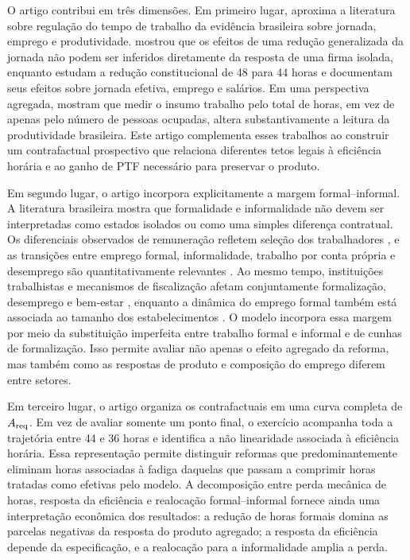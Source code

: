 O artigo contribui em tr\^es dimens\~oes. Em primeiro lugar, aproxima a
literatura sobre regula\c{c}\~ao do tempo de trabalho da evid\^encia brasileira sobre jornada, emprego e
produtividade. \citet{Fernandes1991} mostrou que os efeitos de uma redu\c{c}\~ao
generalizada da jornada n\~ao podem ser inferidos diretamente da resposta de
uma firma isolada, enquanto \citet{GonzagaMenezesFilhoCamargo2003} estudam a
redu\c{c}\~ao constitucional de 48 para 44 horas e documentam seus efeitos
sobre jornada efetiva, emprego e sal\'arios. Em uma perspectiva agregada,
\citet{BarbosaFilhoPessoa2014} mostram que medir o insumo trabalho pelo total
de horas, em vez de apenas pelo n\'umero de pessoas ocupadas, altera
substantivamente a leitura da produtividade brasileira. Este artigo
complementa esses trabalhos ao construir um contrafactual prospectivo que
relaciona diferentes tetos legais \`a efici\^encia hor\'aria e ao ganho de PTF
necess\'ario para preservar o produto.

Em segundo lugar, o artigo incorpora explicitamente a margem
formal--informal. A literatura brasileira mostra que formalidade e
informalidade n\~ao devem ser interpretadas como estados isolados ou como uma
simples diferen\c{c}a contratual. Os diferenciais observados de remunera\c{c}\~ao
refletem sele\c{c}\~ao dos trabalhadores
\citep{MenezesFilhoMendesAlmeida2004}, e as transi\c{c}\~oes entre emprego
formal, informalidade, trabalho por conta pr\'opria e desemprego s\~ao
quantitativamente relevantes \citep{CuriMenezesFilho2006,HirataMachado2010}.
Ao mesmo tempo, institui\c{c}\~oes trabalhistas e mecanismos de
fiscaliza\c{c}\~ao afetam conjuntamente formaliza\c{c}\~ao, desemprego e
bem-estar \citep{Ulyssea2008,Ulyssea2018}, enquanto a din\^amica do emprego
formal tamb\'em est\'a associada ao tamanho dos estabelecimentos
\citep{CorseuilMouraRamos2011}. O modelo incorpora essa margem por meio da
substitui\c{c}\~ao imperfeita entre trabalho formal e informal e de cunhas de
formaliza\c{c}\~ao. Isso permite avaliar n\~ao apenas o efeito agregado da reforma, mas tamb\'em como as respostas de produto e composi\c{c}\~ao do emprego diferem entre setores.

Em terceiro lugar, o artigo organiza os contrafactuais em uma curva completa
de $A_{\mathrm{req}}$. Em vez de avaliar somente um ponto final, o exerc\'icio acompanha
toda a trajet\'oria entre 44 e 36 horas e identifica a n\~ao linearidade
associada \`a efici\^encia hor\'aria. Essa representa\c{c}\~ao permite
distinguir reformas que predominantemente eliminam horas associadas \`a fadiga
daquelas que passam a comprimir horas tratadas como efetivas pelo modelo. A
decomposi\c{c}\~ao entre perda mec\^anica de horas, resposta da efici\^encia e
realoca\c{c}\~ao formal--informal fornece ainda uma interpreta\c{c}\~ao
econ\^omica dos resultados: a redu\c{c}\~ao de horas formais domina as parcelas negativas da resposta do produto agregado; a resposta da efici\^encia depende da especifica\c{c}\~ao, e a realoca\c{c}\~ao para a informalidade amplia a perda.

